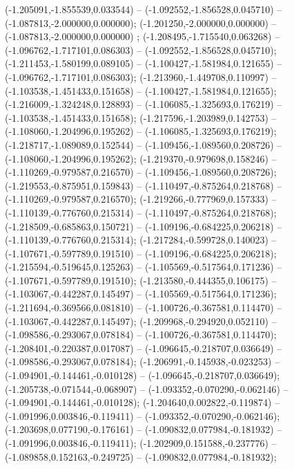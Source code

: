  (-1.205091,-1.855539,0.033544) -- (-1.092552,-1.856528,0.045710) -- (-1.087813,-2.000000,0.000000);
 (-1.201250,-2.000000,0.000000) -- (-1.087813,-2.000000,0.000000) ;
 (-1.208495,-1.715540,0.063268) -- (-1.096762,-1.717101,0.086303) -- (-1.092552,-1.856528,0.045710);
 (-1.211453,-1.580199,0.089105) -- (-1.100427,-1.581984,0.121655) -- (-1.096762,-1.717101,0.086303);
 (-1.213960,-1.449708,0.110997) -- (-1.103538,-1.451433,0.151658) -- (-1.100427,-1.581984,0.121655);
 (-1.216009,-1.324248,0.128893) -- (-1.106085,-1.325693,0.176219) -- (-1.103538,-1.451433,0.151658);
 (-1.217596,-1.203989,0.142753) -- (-1.108060,-1.204996,0.195262) -- (-1.106085,-1.325693,0.176219);
 (-1.218717,-1.089089,0.152544) -- (-1.109456,-1.089560,0.208726) -- (-1.108060,-1.204996,0.195262);
 (-1.219370,-0.979698,0.158246) -- (-1.110269,-0.979587,0.216570) -- (-1.109456,-1.089560,0.208726);
 (-1.219553,-0.875951,0.159843) -- (-1.110497,-0.875264,0.218768) -- (-1.110269,-0.979587,0.216570);
 (-1.219266,-0.777969,0.157333) -- (-1.110139,-0.776760,0.215314) -- (-1.110497,-0.875264,0.218768);
 (-1.218509,-0.685863,0.150721) -- (-1.109196,-0.684225,0.206218) -- (-1.110139,-0.776760,0.215314);
 (-1.217284,-0.599728,0.140023) -- (-1.107671,-0.597789,0.191510) -- (-1.109196,-0.684225,0.206218);
 (-1.215594,-0.519645,0.125263) -- (-1.105569,-0.517564,0.171236) -- (-1.107671,-0.597789,0.191510);
 (-1.213580,-0.444355,0.106175) -- (-1.103067,-0.442287,0.145497) -- (-1.105569,-0.517564,0.171236);
 (-1.211694,-0.369566,0.081810) -- (-1.100726,-0.367581,0.114470) -- (-1.103067,-0.442287,0.145497);
 (-1.209968,-0.294920,0.052110) -- (-1.098586,-0.293067,0.078184) -- (-1.100726,-0.367581,0.114470);
 (-1.208401,-0.220387,0.017087) -- (-1.096645,-0.218707,0.036649) -- (-1.098586,-0.293067,0.078184);
 (-1.206991,-0.145938,-0.023253) -- (-1.094901,-0.144461,-0.010128) -- (-1.096645,-0.218707,0.036649);
 (-1.205738,-0.071544,-0.068907) -- (-1.093352,-0.070290,-0.062146) -- (-1.094901,-0.144461,-0.010128);
 (-1.204640,0.002822,-0.119874) -- (-1.091996,0.003846,-0.119411) -- (-1.093352,-0.070290,-0.062146);
 (-1.203698,0.077190,-0.176161) -- (-1.090832,0.077984,-0.181932) -- (-1.091996,0.003846,-0.119411);
 (-1.202909,0.151588,-0.237776) -- (-1.089858,0.152163,-0.249725) -- (-1.090832,0.077984,-0.181932);
